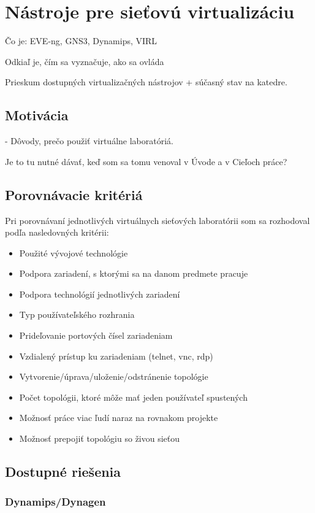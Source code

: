 \chapter{Nástroje pre sieťovú virtualizáciu}

Čo je:
EVE-ng, GNS3, Dynamips, VIRL 

Odkiaľ je, čím sa vyznačuje, ako sa ovláda

Prieskum dostupných virtualizačných nástrojov + súčasný stav na katedre.

\section{Motivácia}
- Dôvody, prečo použiť virtuálne laboratóriá.

  Je to tu nutné dávať, keď som sa tomu venoval v Úvode a v Cieľoch práce?
  
\section{Porovnávacie kritériá}

Pri porovnávaní jednotlivých virtuálnych sieťových laboratórii som sa rozhodoval podľa nasledovných kritérii:
\begin{itemize}
    \item Použité vývojové technológie
    \item Podpora zariadení, s ktorými sa na danom predmete pracuje
    \item Podpora technológií jednotlivých zariadení
    \item Typ používateľského rozhrania
    \item Prideľovanie portových čísel zariadeniam
    \item Vzdialený prístup ku zariadeniam (telnet, vnc, rdp)
    \item Vytvorenie/úprava/uloženie/odstránenie topológie
    \item Počet topológii, ktoré môže mať jeden používateľ spustených
    \item Možnosť práce viac ľudí naraz na rovnakom projekte
    \item Možnosť prepojiť topológiu so živou sieťou
\end{itemize}


\section{Dostupné riešenia}

\subsection{Dynamips/Dynagen}

